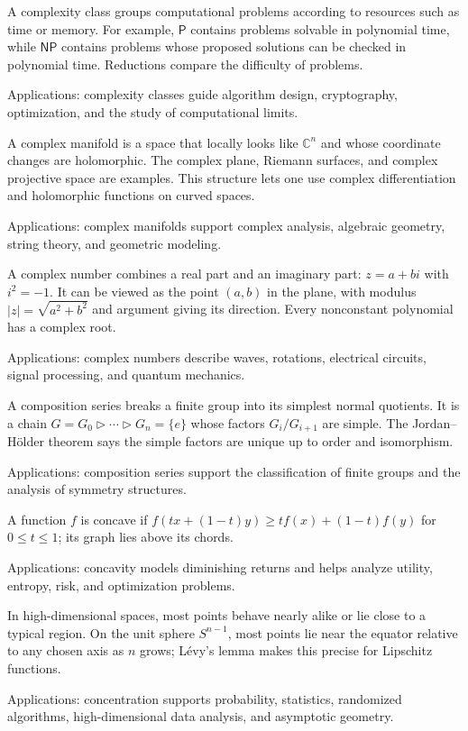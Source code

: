 A complexity class groups computational problems according to resources such as time or memory. For example, $\mathsf P$ contains problems solvable in polynomial time, while $\mathsf{NP}$ contains problems whose proposed solutions can be checked in polynomial time. Reductions compare the difficulty of problems. \par\noindent Applications: complexity classes guide algorithm design, cryptography, optimization, and the study of computational limits.

A complex manifold is a space that locally looks like $\mathbb C^n$ and whose coordinate changes are holomorphic. The complex plane, Riemann surfaces, and complex projective space are examples. This structure lets one use complex differentiation and holomorphic functions on curved spaces. \par\noindent Applications: complex manifolds support complex analysis, algebraic geometry, string theory, and geometric modeling.

A complex number combines a real part and an imaginary part: $z=a+bi$ with $i^2=-1$. It can be viewed as the point $(a,b)$ in the plane, with modulus $|z|=\sqrt{a^2+b^2}$ and argument giving its direction. Every nonconstant polynomial has a complex root. \par\noindent Applications: complex numbers describe waves, rotations, electrical circuits, signal processing, and quantum mechanics.

A composition series breaks a finite group into its simplest normal quotients. It is a chain $G=G_0\triangleright\cdots\triangleright G_n=\{e\}$ whose factors $G_i/G_{i+1}$ are simple. The Jordan--Hölder theorem says the simple factors are unique up to order and isomorphism. \par\noindent Applications: composition series support the classification of finite groups and the analysis of symmetry structures.

A function $f$ is concave if $f(tx+(1-t)y)\ge tf(x)+(1-t)f(y)$ for $0\le t\le1$; its graph lies above its chords. \par\noindent Applications: concavity models diminishing returns and helps analyze utility, entropy, risk, and optimization problems.

In high-dimensional spaces, most points behave nearly alike or lie close to a typical region. On the unit sphere $S^{n-1}$, most points lie near the equator relative to any chosen axis as $n$ grows; Lévy's lemma makes this precise for Lipschitz functions. \par\noindent Applications: concentration supports probability, statistics, randomized algorithms, high-dimensional data analysis, and asymptotic geometry.

